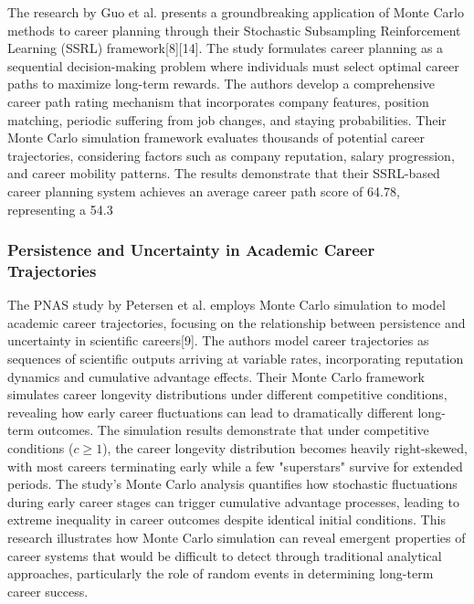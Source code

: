 \documentclass[main.tex]{subfiles}
\begin{document}

The research by Guo et al. presents a groundbreaking application of Monte Carlo methods to career planning through their Stochastic Subsampling Reinforcement Learning (SSRL) framework[8][14]. The study formulates career planning as a sequential decision-making problem where individuals must select optimal career paths to maximize long-term rewards. The authors develop a comprehensive career path rating mechanism that incorporates company features, position matching, periodic suffering from job changes, and staying probabilities. Their Monte Carlo simulation framework evaluates thousands of potential career trajectories, considering factors such as company reputation, salary progression, and career mobility patterns. The results demonstrate that their SSRL-based career planning system achieves an average career path score of 64.78, representing a 54.3%

\subsubsection{Persistence and Uncertainty in Academic Career Trajectories}

The PNAS study by Petersen et al. employs Monte Carlo simulation to model academic career trajectories, focusing on the relationship between persistence and uncertainty in scientific careers[9]. The authors model career trajectories as sequences of scientific outputs arriving at variable rates, incorporating reputation dynamics and cumulative advantage effects. Their Monte Carlo framework simulates career longevity distributions under different competitive conditions, revealing how early career fluctuations can lead to dramatically different long-term outcomes. The simulation results demonstrate that under competitive conditions ($c \geq 1$), the career longevity distribution becomes heavily right-skewed, with most careers terminating early while a few "superstars" survive for extended periods. The study's Monte Carlo analysis quantifies how stochastic fluctuations during early career stages can trigger cumulative advantage processes, leading to extreme inequality in career outcomes despite identical initial conditions. This research illustrates how Monte Carlo simulation can reveal emergent properties of career systems that would be difficult to detect through traditional analytical approaches, particularly the role of random events in determining long-term career success.
\end{document}
